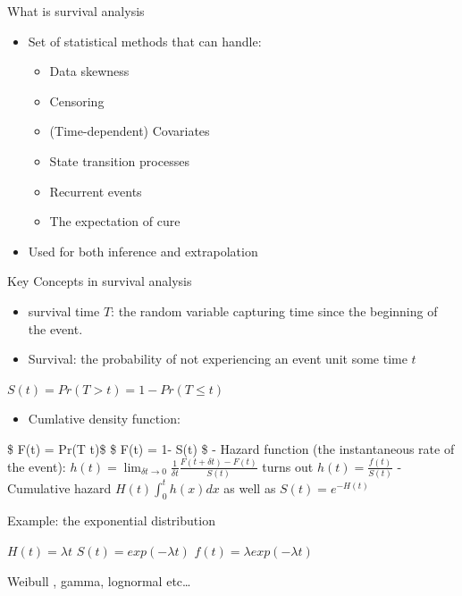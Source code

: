 \documentclass[
  ignorenonframetext,
]{beamer}
\providecommand{\tightlist}{%
  \setlength{\itemsep}{0pt}\setlength{\parskip}{0pt}}
\begin{document}
\begin{frame}{What is survival analysis}
\protect\hypertarget{what-is-survival-analysis}{}

\begin{itemize}
\tightlist
\item
  Set of statistical methods that can handle:

  \begin{itemize}
  \tightlist
  \item
    Data skewness
  \item
    Censoring
  \item
    (Time-dependent) Covariates
  \item
    State transition processes
  \item
    Recurrent events
  \item
    The expectation of cure
  \end{itemize}
\item
  Used for both inference and extrapolation
\end{itemize}

\end{frame}

\begin{frame}{Key Concepts in survival analysis}
\protect\hypertarget{key-concepts-in-survival-analysis}{}

\begin{itemize}
\item
  survival time \(T\): the random variable capturing time since the
  beginning of the event.
\item
  Survival: the probability of not experiencing an event unit some time
  \(t\)
\end{itemize}

\(S(t) = Pr(T >t) = 1- Pr(T \leq t)\)

\begin{itemize}
\tightlist
\item
  Cumlative density function:
\end{itemize}

\$ F(t) = Pr(T \leq t)\$ \$ F(t) = 1- S(t) \$ - Hazard function (the
instantaneous rate of the event):
\(h(t) = \lim_{\delta t \rightarrow 0}\frac{1}{\delta t} \frac{ F(t + \delta t) - F(t)}{S(t)}\)
turns out \(h(t) = \frac{f(t)}{S(t)}\) - Cumulative hazard
\(H(t) \int^t_0 {h(x)dx}\) as well as \(S(t) = e^{-H(t)}\)

\end{frame}

\begin{frame}{Example: the exponential distribution}
\protect\hypertarget{example-the-exponential-distribution}{}

\(H(t) = \lambda t\) \(S(t) = exp(-\lambda t)\)
\(f(t) = \lambda exp(-\lambda t)\)

Weibull , gamma, lognormal etc\ldots{}

\end{frame}
\end{document}
